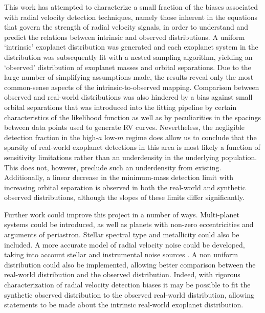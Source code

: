 \documentclass[12pt,manuscript]{aastex}
\begin{document}
This work has attempted to characterize a small fraction of the biases associated with radial velocity detection techniques, namely those inherent in the equations that govern the strength of radial velocity signals, in order to understand and predict the relations between intrinsic and observed distributions.
A uniform `intrinsic' exoplanet distribution was generated and each exoplanet system in the distribution was subsequently fit with a nested sampling algorithm, yielding an `observed' distribution of exoplanet masses and orbital separations.
Due to the large number of simplifying assumptions made, the results reveal only the most common-sense aspects of the intrinsic-to-observed mapping.
Comparison between observed and real-world distributions was also hindered by a bias against small orbital separations that was introduced into the fitting pipeline by certain characteristics of the likelihood function as well as by peculiarities in the spacings between data points used to generate RV curves.
Nevertheless, the negligible detection fraction in the high-$a$ low-$m$ regime does allow us to conclude that the sparsity of real-world exoplanet detections in this area is most likely a function of sensitivity limitations rather than an underdensity in the underlying population.
This does not, however, preclude such an underdensity from existing.
Additionally, a linear decrease in the minimum-mass detection limit with increasing orbital separation is observed in both the real-world and synthetic observed distributions, although the slopes of these limits differ significantly.

Further work could improve this project in a number of ways.
Multi-planet systems could be introduced, as well as planets with non-zero eccentricities and arguments of periastron. 
Stellar spectral type and metallicity could also be included.
A more accurate model of radial velocity noise could be developed, taking into account stellar and instrumental noise sources \citep[e.g.][]{dumusque16}.
A non uniform distribution could also be implemented, allowing better comparison between the real-world distribution and the observed distribution.
Indeed, with rigorous characterization of radial velocity detection biases it may be possible to fit the synthetic observed distribution to the observed real-world distribution, allowing statements to be made about the intrinsic real-world exoplanet distribution.
\end{document}
